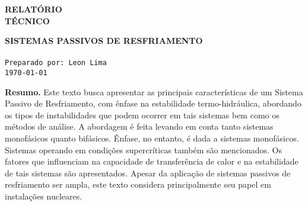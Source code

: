 \documentclass[a4paper,portuguese,10pt]{article}
\begin{document}
\thispagestyle{empty}

\begin{minipage}{0.5\linewidth}
\large\textbf{RELATÓRIO\\TÉCNICO}
\end{minipage}
\begin{minipage}{0.5\linewidth}
\flushright
\end{minipage}

\hrulefill

\Large \color{NavyBlue} \textbf{SISTEMAS PASSIVOS DE RESFRIAMENTO}\\
\color{Black}\\ %
\normalsize \texttt{Preparado por: Leon Lima}\\%
\normalsize \texttt{\today}


\vspace{-2mm}
\hrulefill
\begin{center}
\begin{minipage}{0.8\linewidth}
\footnotesize{\textbf{Resumo.} Este texto busca apresentar as principais características de um Sistema Passivo de Resfriamento, com ênfase na estabilidade termo-hidráulica, abordando os tipos de instabilidades que podem ocorrer em tais sistemas bem como os métodos de análise. A abordagem é feita levando em conta tanto sistemas monofásicos quanto bifásicos. Ênfase, no entanto, é dada a sistemas monofásicos. Sistemas operando em condições supercríticas também são mencionados. Os fatores que influenciam na capacidade de transferência de calor e na estabilidade de tais sistemas são apresentados. Apesar da aplicação de sistemas passivos de resfriamento ser ampla, este texto considera principalmente seu papel em instalações nucleares.}
\end{minipage}
\end{center}
\hrulefill
\end{document}
